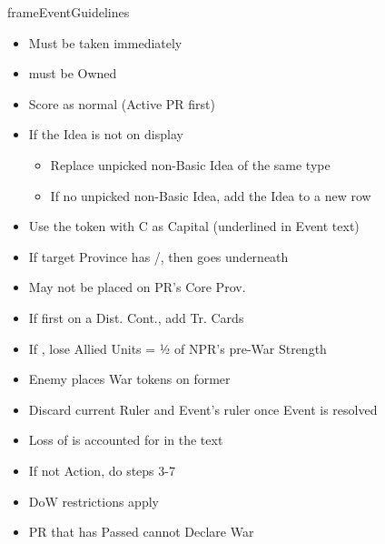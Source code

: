 \documentclass[10pt]{article}
\newlength{\fhEventGuidelines} \setlength\fhEventGuidelines{34.5\baselineskip}
\begin{document}
\begin{dynamiccontents*}{frameEventGuidelines}
\begin{eubox}{\fhEventGuidelines}
\begin{multicols*}{2}
		\begin{itemize}
			\item Must be taken immediately
		\end{itemize}
		\begin{itemize}
			\item \town must be Owned
		\end{itemize}
		\begin{itemize}
			\item Score \prestige as normal (Active PR first)
			\item If the Idea is not on display
			\begin{itemize}
				\item Replace unpicked non-Basic Idea of the same type
				\item If no unpicked non-Basic Idea, add the Idea to a new row
			\end{itemize}
		\end{itemize}
		\begin{itemize}
			\item Use the token with C as Capital (underlined in Event text)
			\item If target Province has \town/\vassal, then \dnpr goes underneath
			\item May not be placed on PR's Core Prov.
			\item If first \dnpr on a Dist. Cont., add Tr. Cards
		\end{itemize}
		\begin{itemize}
			\item If \activeally, lose Allied Units = ½ of NPR's pre-War Strength
			\item Enemy places War tokens on former \activeally
		\end{itemize}
		\begin{itemize}
			\item Discard current Ruler and Event's ruler once Event is resolved
		\end{itemize}
		\begin{itemize}
			\item Loss of \authority is accounted for in the text
		\end{itemize}
		\begin{itemize}
			\item If not  Action, do steps 3-7
			\item DoW restrictions apply
			\item PR that has Passed cannot Declare War
		\end{itemize}
	\end{multicols*}
\end{eubox}\end{dynamiccontents*}
\end{document}
